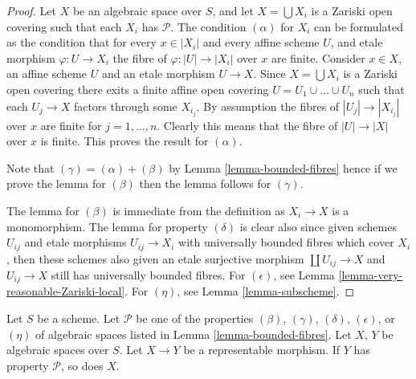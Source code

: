 \begin{proof}
Let $X$ be an algebraic space over $S$, and let $X = \bigcup X_i$ is a
Zariski open covering such that each $X_i$ has $\mathcal{P}$.
The condition $(\alpha)$ for $X_i$ can be formulated as the condition
that for every $x \in |X_i|$ and every affine scheme $U$, and etale morphism
$\varphi : U \to X_i$ the fibre of $\varphi : |U| \to |X_i|$
over $x$ are finite. Consider $x \in X$, an affine scheme $U$ and
an etale morphism $U \to X$. Since $X = \bigcup X_i$ is a
Zariski open covering there exits a finite affine open covering
$U = U_1 \cup \ldots \cup U_n$ such that each $U_j \to X$ factors through
some $X_{i_j}$. By assumption the fibres of $|U_j | \to |X_{i_j}|$
over $x$ are finite for $j = 1, \ldots, n$. Clearly this means that
the fibre of $|U| \to |X|$ over $x$ is finite.
This proves the result for $(\alpha)$.

\medskip\noindent
Note that $(\gamma) = (\alpha) + (\beta)$ by
Lemma \ref{lemma-bounded-fibres}
hence if we prove the lemma for $(\beta)$ then the lemma follows for
$(\gamma)$.

\medskip\noindent
The lemma for $(\beta)$ is immediate from the definition as $X_i \to X$ is
a monomorphism. The lemma for property $(\delta)$ is clear also since given
schemes $U_{ij}$ and etale morphisms $U_{ij} \to X_i$ with universally
bounded fibres which cover $X_i$, then these schemes also given an
etale surjective morphism $\coprod U_{ij} \to X$ and $U_{ij} \to X$
still has universally bounded fibres. For $(\epsilon)$, see
Lemma \ref{lemma-very-reasonable-Zariski-local}.
For $(\eta)$, see Lemma \ref{lemma-subscheme}.
\end{proof}

\begin{lemma}
\label{lemma-representable-properties}
Let $S$ be a scheme.
Let $\mathcal{P}$ be one of the properties
$(\beta)$, $(\gamma)$, $(\delta)$, $(\epsilon)$, or $(\eta)$
of algebraic spaces listed in Lemma \ref{lemma-bounded-fibres}.
Let $X$, $Y$ be algebraic spaces over $S$.
Let $X \to Y$ be a representable morphism.
If $Y$ has property $\mathcal{P}$, so does $X$.
\end{lemma}

